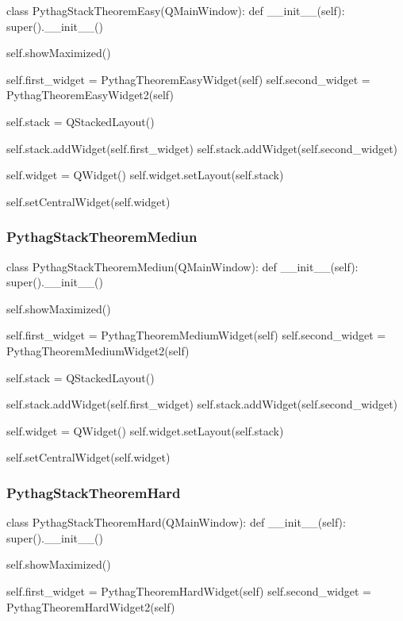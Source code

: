 \begin{landscape}
\begin{python}
class PythagStackTheoremEasy(QMainWindow):
    def __init__(self):
        super().__init__()

        self.showMaximized()

        self.first_widget = PythagTheoremEasyWidget(self)
        self.second_widget = PythagTheoremEasyWidget2(self)

        self.stack = QStackedLayout()

        self.stack.addWidget(self.first_widget)
        self.stack.addWidget(self.second_widget)

        self.widget = QWidget()
        self.widget.setLayout(self.stack)

        self.setCentralWidget(self.widget)
\end{python}

\subsubsection{PythagStackTheoremMediun}

\begin{python}
class PythagStackTheoremMediun(QMainWindow):
    def __init__(self):
        super().__init__()

        self.showMaximized()

        self.first_widget = PythagTheoremMediumWidget(self)
        self.second_widget = PythagTheoremMediumWidget2(self)

        self.stack = QStackedLayout()

        self.stack.addWidget(self.first_widget)
        self.stack.addWidget(self.second_widget)

        self.widget = QWidget()
        self.widget.setLayout(self.stack)

        self.setCentralWidget(self.widget)
\end{python}

\subsubsection{PythagStackTheoremHard}

\begin{python}
class PythagStackTheoremHard(QMainWindow):
    def __init__(self):
        super().__init__()

        self.showMaximized()

        self.first_widget = PythagTheoremHardWidget(self)
        self.second_widget = PythagTheoremHardWidget2(self)


\end{python}
\end{landscape}
